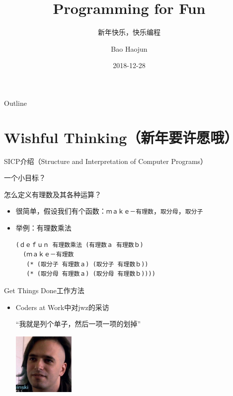 \documentclass[presentation,dvipdfmx,CJKbookmarks]{beamer}
\author{Bao Haojun}
\date{2018-12-28}
\title{Programming for Fun}
\subtitle{新年快乐，快乐编程}
\begin{document}
\begin{CJK*}{UTF8}{simsun}

\maketitle
\begin{frame}{Outline}
\tableofcontents
\end{frame}

\CJKtilde

\section{Wishful Thinking（新年要许愿哦）}
\label{sec:orgc802799}

\begin{frame}[fragile,label={sec:orgc7d481b}]{SICP\thinspace 介绍（Structure and Interpretation of Computer Programs）}
 \pause

\begin{block}{一个小目标？}
\pause
\end{block}
\begin{block}{怎么定义有理数及其各种运算？}
\pause
\begin{itemize}[<+->]
\item 很简单，假设我们有\thinspace 个函数：\texttt{ｍａｋｅ－有理数}，\texttt{取分母}，\texttt{取分子}
\item 举例：有理数乘法

\begin{verbatim}
(ｄｅｆｕｎ 有理数乘法 (有理数ａ 有理数ｂ)
  (ｍａｋｅ－有理数
   (* (取分子 有理数ａ) (取分子 有理数ｂ))
   (* (取分母 有理数ａ) (取分母 有理数ｂ))))
\end{verbatim}
\end{itemize}
\end{block}
\end{frame}

\begin{frame}[label={sec:org76dee77}]{Get Things Done\thinspace 工作方法}
\pause
\begin{itemize}[<+->]
\item Coders at Work\thinspace 中对\thinspace jwz\thinspace 的采访

“我就是列个单子，然后一项一项的划掉”

\begin{center}
\includegraphics[width=3cm]{./jwz.ps}
\end{center}


\end{itemize}
\end{frame}
\end{CJK*}
\end{document}
